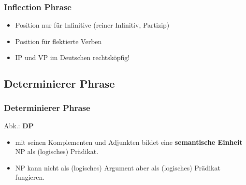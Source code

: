 \begin{frame}
\frametitle{Inflection Phrase}

	\begin{itemize}
		\item {} \ras Position nur für Infinitive (reiner Infinitiv, Partizip)
		\item {} \ras Position für flektierte Verben
		\item IP und VP im Deutschen \ras rechtsköpfig!		
	\end{itemize}


\begin{minipage}[b]{0.48\textwidth}
	\centering
\end{minipage}  
%
%          
\begin{minipage}[b]{0.48\textwidth}
	\centering
 \end{minipage}  

\end{frame}


\subsection{Determinierer Phrase}

\begin{frame}
\frametitle{Determinierer Phrase}

Abk.: \textbf{DP} 

\begin{itemize}
	\item {} mit seinen Komplementen und Adjunkten bildet eine \textbf{semantische Einheit} \ras NP als (logisches) Prädikat.
	\item NP kann nicht als (logisches) Argument aber als (logisches) Prädikat fungieren.
	\eal 
	\zl

\end{itemize}	

\nocite{MyP16b} \nocite{MyP16c}

\end{frame}

